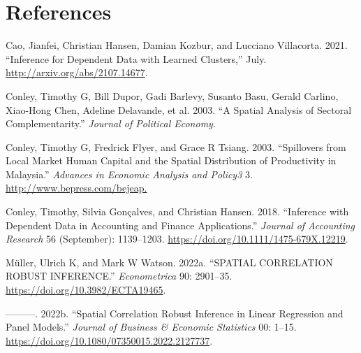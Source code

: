 \documentclass[
]{article}
\newlength{\cslhangindent}
\newlength{\cslentryspacingunit} %
\newenvironment{CSLReferences}[2] %
 {%
  \setlength{\parindent}{0pt}
  \ifodd #1
  \let\oldpar\par
  \def\par{\hangindent=\cslhangindent\oldpar}
  \fi
  \setlength{\parskip}{#2\cslentryspacingunit}
 }%
 {}
\begin{document}
\hypertarget{references}{%
\section*{References}\label{references}}

\hypertarget{refs}{}
\begin{CSLReferences}{1}{0}
\leavevmode{}%
Cao, Jianfei, Christian Hansen, Damian Kozbur, and Lucciano Villacorta.
2021. {``Inference for Dependent Data with Learned Clusters,''} July.
\url{http://arxiv.org/abs/2107.14677}.

\leavevmode{}%
Conley, Timothy G, Bill Dupor, Gadi Barlevy, Susanto Basu, Gerald
Carlino, Xiao-Hong Chen, Adeline Delavande, et al. 2003. {``A Spatial
Analysis of Sectoral Complementarity.''} \emph{Journal of Political
Economy}.

\leavevmode{}%
Conley, Timothy G, Fredrick Flyer, and Grace R Tsiang. 2003.
{``Spillovers from Local Market Human Capital and the Spatial
Distribution of Productivity in Malaysia.''} \emph{Advances in Economic
Analysis and Policy3} 3. \url{http://www.bepress.com/bejeap.}

\leavevmode{}%
Conley, Timothy, Silvia Gonçalves, and Christian Hansen. 2018.
{``Inference with Dependent Data in Accounting and Finance
Applications.''} \emph{Journal of Accounting Research} 56 (September):
1139--1203. \url{https://doi.org/10.1111/1475-679X.12219}.

\leavevmode{}%
Müller, Ulrich K, and Mark W Watson. 2022a. {``SPATIAL CORRELATION
ROBUST INFERENCE.''} \emph{Econometrica} 90: 2901--35.
\url{https://doi.org/10.3982/ECTA19465}.

\leavevmode{}%
---------. 2022b. {``Spatial Correlation Robust Inference in Linear
Regression and Panel Models.''} \emph{Journal of Business \& Economic
Statistics} 00: 1--15.
\url{https://doi.org/10.1080/07350015.2022.2127737}.

\end{CSLReferences}
\end{document}
